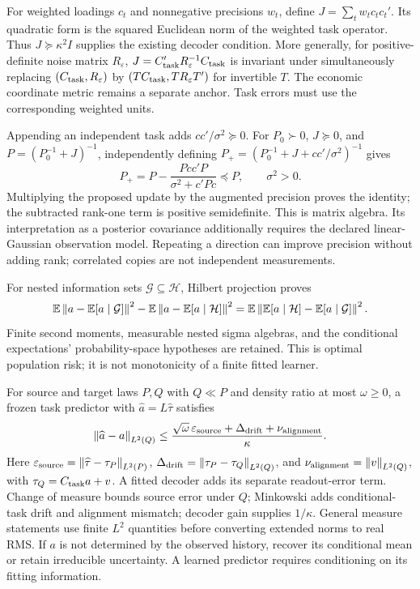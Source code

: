 \documentclass[11pt]{article}
\renewcommand{\lean}[1]{\ignorespaces}
\renewcommand{\leanok}{\ignorespaces}
\begin{document}
For weighted loadings $c_t$ and nonnegative precisions $w_t$, define
$J=\sum_t w_t c_t c_t'$. Its quadratic form is the squared Euclidean norm of the
weighted task operator. Thus $J\succeq\kappa^2I$ supplies the existing decoder
condition. More generally, for positive-definite noise matrix $R_\varepsilon$,
$J=C_{\rm task}'R_\varepsilon^{-1}C_{\rm task}$ is invariant under
simultaneously
replacing $(C_{\rm task},R_\varepsilon)$ by
$(TC_{\rm task},TR_\varepsilon T')$ for invertible $T$.
\lean{FreeFoundations.TaskInformation.distinguishes_of_loewner_floor,
FreeFoundations.TaskInformation.task_units_invariant}\leanok{}
The economic coordinate metric remains a separate anchor. Task errors must use
the corresponding weighted units.

Appending an independent task adds $cc'/\sigma^2\succeq0$. For
$P_0\succ0$, $J\succeq0$, and $P={(P_0^{-1}+J)}^{-1}$, independently defining
$P_+={(P_0^{-1}+J+cc'/\sigma^2)}^{-1}$ gives
\[
  P_+=P-\frac{Pcc'P}{\sigma^2+c'Pc}\preceq P,\qquad \sigma^2>0.
\]
\lean{FreeFoundations.TaskInformation.posterior_precision_update,
FreeFoundations.TaskInformation.posterior_precision_mono}\leanok{}
Multiplying the proposed update by the augmented precision proves the identity;
the subtracted rank-one term is positive semidefinite. This is matrix algebra.
Its interpretation as a posterior covariance additionally requires the declared
linear-Gaussian observation model. Repeating a direction can improve precision
without adding rank; correlated copies are not independent measurements.

For nested information sets $\mathcal G\subseteq\mathcal H$, Hilbert projection
proves
\[
  \mathbb E\left\lVert a-\mathbb E[a\mid\mathcal G]\right\rVert^2-
  \mathbb E\left\lVert a-\mathbb E[a\mid\mathcal H]\right\rVert^2
  =\mathbb E\left\lVert\mathbb E[a\mid\mathcal H]-\mathbb E[a\mid\mathcal G]\right\rVert^2.
\]
\lean{FreeFoundations.Information.nested_condExp}\leanok{}
Finite second moments, measurable nested sigma algebras, and the conditional
expectations' probability-space hypotheses are retained. This is optimal
population risk; it is not monotonicity of a finite fitted learner.

For source and target laws $P,Q$ with $Q\ll P$ and density ratio at most
$\omega\ge0$, a frozen task predictor with $\widehat a=L\widehat\tau$ satisfies
\[
  \left\lVert\widehat a-a\right\rVert_{L^2(Q)}\le
  \frac{\sqrt\omega\,\varepsilon_{\rm source}
  +\Delta_{\rm drift}+\nu_{\rm alignment}}{\kappa}.
\]
\lean{FreeFoundations.Transfer.source_target_recovery,
FreeFoundations.Transfer.measure_source_target_recovery}\leanok{}
Here $\varepsilon_{\rm source}=\left\lVert\widehat\tau-\tau_P\right\rVert_{L^2(P)}$,
$\Delta_{\rm drift}=\left\lVert\tau_P-\tau_Q\right\rVert_{L^2(Q)}$, and
$\nu_{\rm alignment}=\left\lVert v\right\rVert_{L^2(Q)}$, with
$\tau_Q=C_{\rm task}a+v$. A fitted decoder adds its separate readout-error term.
Change of measure bounds source error under $Q$; Minkowski adds conditional-task
drift and alignment mismatch; decoder gain supplies $1/\kappa$.
General measure statements use finite $L^2$ quantities before converting
extended norms to real RMS\@. If $a$ is not determined by the observed history,
recover its conditional mean or retain irreducible uncertainty. A learned
predictor requires conditioning on its fitting information.
\end{document}
